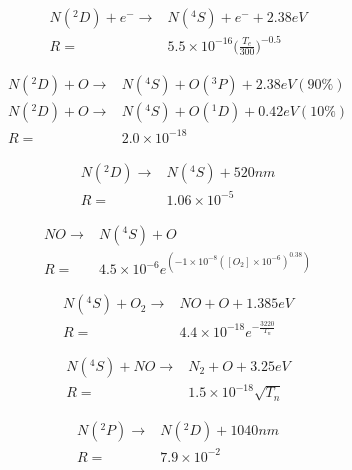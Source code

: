\documentclass[twoside,10pt]{book}
\begin{document}
\begin{equation}
\begin{split}
N(^2D) + e^- \rightarrow & N(^4S) + e^- + 2.38 eV\\
R = & 5.5 \times 10^{-16} \bigg(\frac{T_e}{300}\bigg)^{-0.5} %
\end{split}
\end{equation}

\begin{equation}
\begin{split}
N(^2D) + O \rightarrow & N(^4S) + O(^3P) + 2.38 eV (90\%)\\
N(^2D) + O \rightarrow & N(^4S) + O(^1D) + 0.42 eV (10\%)\\
R = & 2.0 \times 10^{-18}
\end{split}
\end{equation}

\begin{equation}
\begin{split}
N(^2D) \rightarrow & N(^4S) + 520nm \\
R = & 1.06 \times 10^{-5}
\end{split}
\end{equation}

\begin{equation}
\begin{split}
NO \rightarrow & N(^4S) + O \\
R = & 4.5 \times 10^{-6} e^{(-1\times 10^{-8}([O_2]\times 10^{-6})^{0.38})}
\end{split}
\end{equation}

\begin{equation}
\begin{split}
N(^4S) + O_2 \rightarrow & NO + O + 1.385 eV \\
R = & 4.4 \times 10^{-18} e^{-\frac{3220}{T_n}}
\end{split}
\end{equation}

\begin{equation}
\begin{split}
N(^4S) + NO \rightarrow & N_2 + O + 3.25 eV\\
R = & 1.5 \times 10^{-18} \sqrt{T_n}
\end{split}
\end{equation}

\begin{equation}
\begin{split}
N(^2P) \rightarrow & N(^2D) + 1040nm\\
R = & 7.9 \times 10^{-2}
\end{split}
\end{equation}
\end{document}
